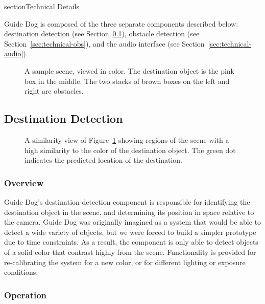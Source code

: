 \/section{Technical Details}
\label{sec:technical}

Guide Dog is composed of the three separate components described below: destination detection
(see Section~\ref{sec:technical-dest}),
obstacle detection (see Section~\ref{sec:technical-obs}), and the audio
interface (see Section~\ref{sec:technical-audio}).

\begin{figure}
\caption{A sample scene, viewed in color. The destination object is the pink box
  in the middle. The two stacks of brown boxes on the left and right are
  obstacles.}
\label{fig:color}
\end{figure}

\subsection{Destination Detection}
\label{sec:technical-dest}

\begin{figure}
\caption{A similarity view of Figure~\ref{fig:color} showing regions of the scene with a high similarity
to the color of the destination object. The green dot indicates the predicted location of the destination.}
\label{fig:destination}
\end{figure}

\subsubsection{Overview}
\label{sec:technical-dest-overview}

Guide Dog's destination detection component is responsible for identifying the
destination object in the scene, and determining its position in space
relative to the camera. Guide Dog was originally imagined as a system that
would be able to detect a wide variety of objects, but we were forced to
build a simpler prototype due to time constraints. As a result, the component 
is only able to detect objects of a solid color that contrast highly from the 
scene. Functionality is provided for re-calibrating the system for a new color, 
or for different lighting or exposure conditions. 

\subsubsection{Operation}
\label{sec:technical-dest-op}

